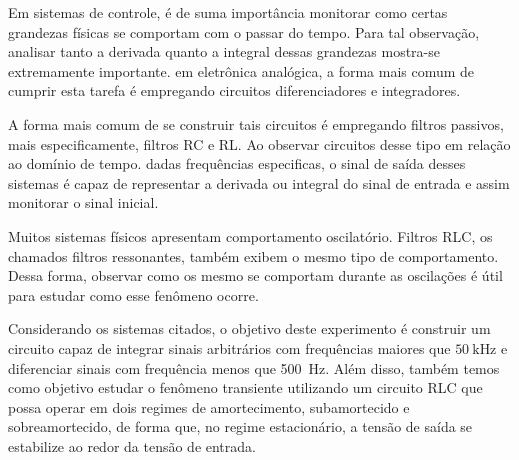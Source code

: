 Em sistemas de controle, é de suma importância monitorar como certas grandezas físicas se comportam com o passar do tempo. Para tal observação, analisar tanto a derivada quanto a integral dessas grandezas mostra-se extremamente importante. em eletrônica analógica, a forma mais comum de cumprir esta tarefa é empregando circuitos diferenciadores e integradores.

A forma mais comum de se construir tais circuitos é empregando filtros passivos, mais especificamente, filtros RC e RL. Ao observar circuitos desse tipo em relação ao domínio de tempo. dadas frequências especificas, o sinal de saída desses sistemas é capaz de representar a derivada ou integral do sinal de entrada e assim monitorar o sinal inicial.

Muitos sistemas físicos apresentam comportamento oscilatório. Filtros RLC, os chamados filtros ressonantes, também  exibem o mesmo tipo de comportamento. Dessa forma, observar como os mesmo se comportam durante as oscilações é útil para estudar como esse fenômeno ocorre.

Considerando os sistemas citados, o objetivo deste experimento é construir um circuito capaz de integrar sinais arbitrários com frequências maiores que $\SI{50}{\kilo\hertz}$ e diferenciar sinais com frequência menos que \SI{500}{\hertz}. Além disso, também temos como objetivo estudar o fenômeno transiente utilizando um circuito RLC que possa operar em dois regimes de amortecimento, subamortecido e sobreamortecido, de forma que, no regime estacionário, a tensão de saída se estabilize ao redor da tensão de entrada.
